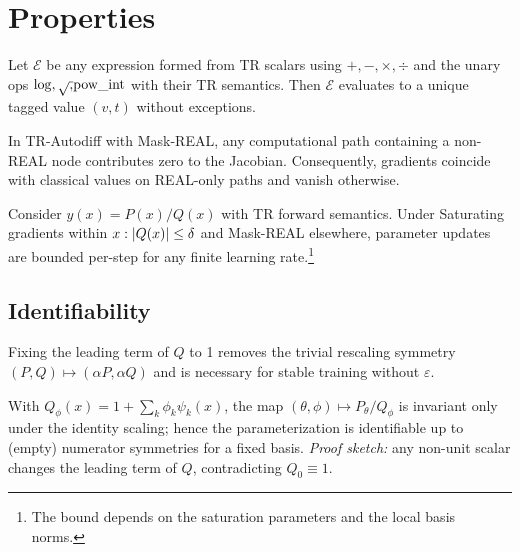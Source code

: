 \documentclass[11pt,twoside]{article}
\begin{document}
\section{Properties}
\label{sec:properties}

\begin{proposition}[Totality]\label{prop:total}
Let $\mathcal{E}$ be any expression formed from TR scalars using $+, -, \times, \div$ and the unary ops $\\{\log, \sqrt, \text{pow\_int}\\}$ with their TR semantics. Then $\mathcal{E}$ evaluates to a unique tagged value $(v,t)$ without exceptions.
\end{proposition}

\begin{lemma}\label{lem:maskreal}
In TR-Autodiff with Mask-REAL, any computational path containing a non-REAL node contributes zero to the Jacobian. Consequently, gradients coincide with classical values on REAL-only paths and vanish otherwise.
\end{lemma}

\begin{proposition}\label{prop:bounded}
Consider $y(x)=P(x)/Q(x)$ with TR forward semantics. Under Saturating gradients within $\\{x: |Q(x)|\le \delta\\}$ and Mask-REAL elsewhere, parameter updates are bounded per-step for any finite learning rate.\footnote{The bound depends on the saturation parameters and the local basis norms.}
\end{proposition}

\subsection{Identifiability}

Fixing the leading term of $Q$ to 1 removes the trivial rescaling symmetry $(P,Q)\mapsto (\alpha P, \alpha Q)$ and is necessary for stable training without $\varepsilon$.

\begin{proposition}\label{prop:ident}
With $Q_\phi(x)=1+\sum_k \phi_k\psi_k(x)$, the map $(\theta,\phi)\mapsto P_\theta/Q_\phi$ is invariant only under the identity scaling; hence the parameterization is identifiable up to (empty) numerator symmetries for a fixed basis. \emph{Proof sketch:} any non-unit scalar changes the leading term of $Q$, contradicting $Q_0\equiv 1$.
\end{proposition}
\end{document}
